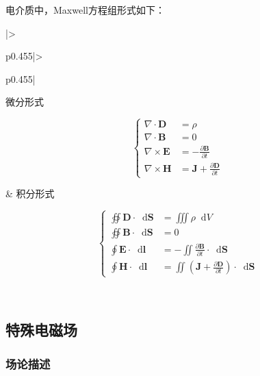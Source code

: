 \documentclass[UTF8,fontset=fandol,zihao=5]{ctexart}
\newcommand{\vect}[1]{\bm{#1}}
\newcommand{\dif}{\mathop{}\!\mathrm{d}}
\begin{document}
电介质中，Maxwell方程组形式如下：

\noindent\begin{minipage}{\linewidth}
\centering
\begin{tabular}{|>{\raggedright\arraybackslash}p{}|>{\raggedright\arraybackslash}p{}|}
\hline

\centering 微分形式

\[
\left\{
\begin{aligned}
\nabla\cdot\vect{D} &= \rho \\
\nabla\cdot\vect{B} &= 0\\
\nabla\times\vect{E} &= -\frac{\partial\vect{B}}{\partial t}\\
\nabla\times\vect{H} &= \vect{J}+\frac{\partial\vect{D}}{\partial t}
\end{aligned}
\right.
\]\par\strut

& \centering\arraybackslash 积分形式

\[
\left\{
\begin{aligned}
\oiint \vect{D}\cdot\dif \vect{S}
&= \iiint \rho \dif {V}\\
\oiint \vect{B}\cdot\dif \vect{S}
&= 0\\
\oint \vect{E}\cdot\dif \vect{l}
&= -\iint \frac{\partial\vect{B}}{\partial t} \cdot\dif \vect{S}\\
\oint \vect{H}\cdot\dif \vect{l}
&= \iint \left(\vect{J}+\frac{\partial\vect{D}}{\partial t}\right) \cdot \dif \vect S
\end{aligned}
\right.
\]\par\strut

\\ \hline

\end{tabular}
\end{minipage}\par

\subsection{特殊电磁场}

\subsubsection{场论描述}
\end{document}
